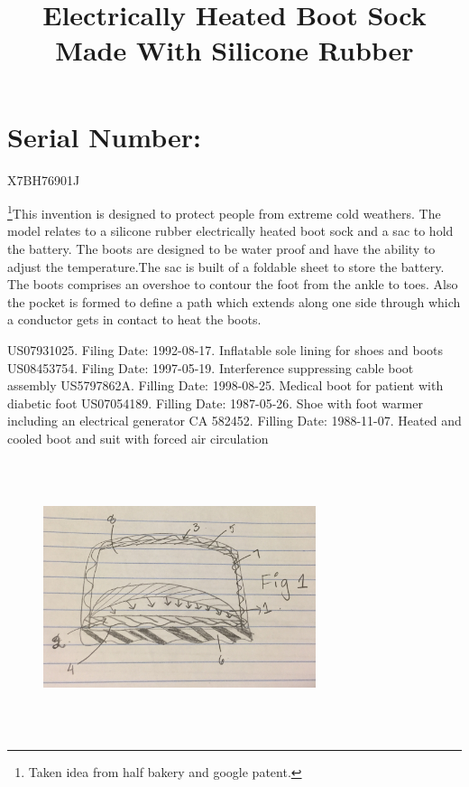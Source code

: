 \documentclass[11pt, english]{uspatent}
\begin{document}
\section*{Serial Number:}
X7BH76901J

\setPrintingModeApplication

\title{Electrically Heated Boot Sock Made With Silicone Rubber}
\date{}
\maketitle

\footnote{Taken idea from half bakery and google patent.}This invention is designed to protect people from extreme cold weathers. The model relates to a silicone rubber electrically heated boot sock and a sac to hold the battery. The boots are designed to be water proof and have the ability to adjust the temperature.The sac is built of a foldable sheet to store the battery. The boots comprises an overshoe to contour the foot from the ankle to toes. Also the pocket is formed to define a path which extends along one side through which a conductor gets in contact to heat the boots.


\patentParagraph US07931025. Filing Date: 1992-08-17. Inflatable sole lining for shoes and boots
\patentParagraph US08453754. Filing Date: 1997-05-19. Interference suppressing cable boot assembly
\patentParagraph US5797862A. Filling Date: 1998-08-25. Medical boot for patient with diabetic foot
\patentParagraph  US07054189. Filling Date: 1987-05-26. Shoe with foot warmer including an electrical generator
\patentParagraph CA 582452. Filling Date: 1988-11-07. Heated and cooled boot and suit with forced air circulation


\begin{figure}[h]
	\centering
	\includegraphics[width=8cm, height=8cm]{Fig1.jpg} 
	\label{fig:fig1}
\end{figure}
\end{document}
